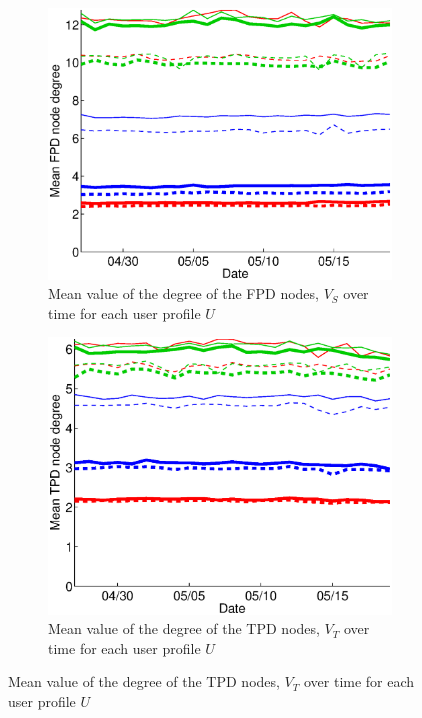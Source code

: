 \documentclass{sig-alternate}
\begin{document}
\begin{figure}
   \begin{subfigure}{.45\textwidth}
    \includegraphics[width=\textwidth]{figures/plots/first-means-entities.eps}
    \caption{Mean value of the degree of the FPD nodes, $V_S$ over time for each user profile $U$}
    \label{fig:first_means_entities}
  \end{subfigure}

  \begin{subfigure}{.45\textwidth}
    \includegraphics[width=\textwidth]{figures/plots/third-means-entities.eps}
    \caption{Mean value of the degree of the TPD nodes, $V_T$ over time for each user profile $U$}
    \label{fig:third_means_entities}
  \end{subfigure}


\end{figure}
\end{document}

